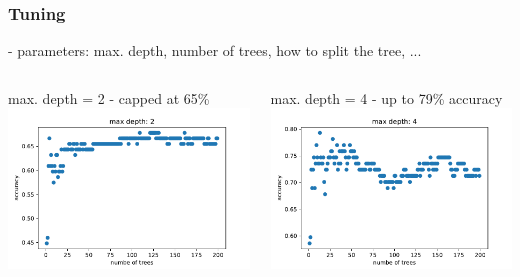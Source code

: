 \documentclass{beamer}
\begin{document}
\begin{frame}
\frametitle{Tuning}
- parameters: max. depth, number of trees, how to split the tree, ...
\begin{columns}[T]
    \begin{column}{.5\textwidth}
     \begin{block}{}
     \end{block}
     \begin{block}{max. depth = 2}
     	- capped at 65\%\\
        \includegraphics[scale=0.4]{
        result2.pdf}
     \end{block}
    \end{column}
    \begin{column}{.5\textwidth}
    \begin{block}{max. depth = 4}
    - up to 79\% accuracy\\
       \includegraphics[scale=0.4]
       {result4.pdf}
    \end{block}
    \end{column}
  \end{columns}
\end{frame}
\end{document}
